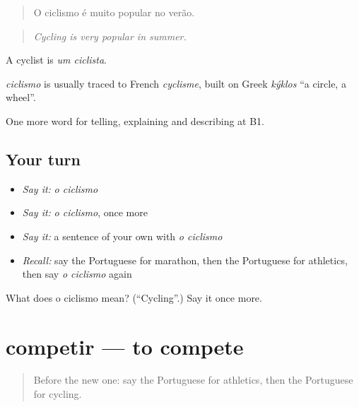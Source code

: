\begin{quote}
O ciclismo é muito popular no verão.
\end{quote}

\begin{quote}
\emph{Cycling is very popular in summer.}
\end{quote}

A cyclist is \emph{um ciclista}.

\begin{cousinweb}
\emph{ciclismo} is usually traced to French \emph{cyclisme}, built on Greek \emph{kýklos} \textquotedblleft{}a circle, a wheel\textquotedblright{}.
\end{cousinweb}

\begin{grammarlens}[title={What you've built}]
One more word for telling, explaining and describing at B1.
\end{grammarlens}

\subsection*{Your turn}
\begin{itemize}
\raggedright
  \item \emph{Say it:} \emph{o ciclismo}
  \item \emph{Say it:} \emph{o ciclismo}, once more
  \item \emph{Say it:} a sentence of your own with \emph{o ciclismo}
  \item \emph{Recall:} say the Portuguese for marathon, then the Portuguese for athletics, then say \emph{o ciclismo} again
\end{itemize}

\begin{tcolorbox}[breakable,colback=teal!4,colframe=teal!35!black,title={Before you move on}]
What does o ciclismo mean? (\textquotedblleft{}Cycling\textquotedblright{}.) Say it once more.
\end{tcolorbox}
\section[competir]{competir — to compete}

\label{lesson:PT-C513-competir}



\begin{quote}
Before the new one: say the Portuguese for athletics, then the Portuguese for cycling.
\end{quote}

